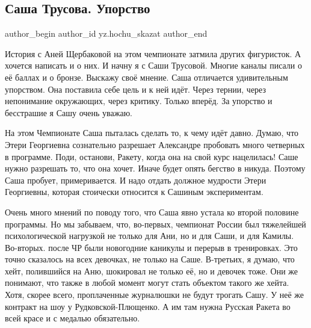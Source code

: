  
 
 
 
 
\subsection{Саша Трусова. Упорство}
\label{sec:18_01_2022.yz.hochu_skazat.1.trusova}

\ifcmt
 author_begin
   author_id yz.hochu_skazat
 author_end
\fi

История с Аней Щербаковой на этом чемпионате затмила других фигуристок. А
хочется написать и о них. И начну я с Саши Трусовой. Многие каналы писали о её
баллах и о бронзе. Выскажу своё мнение. Саша отличается удивительным упорством.
Она поставила себе цель и к ней идёт. Через тернии, через непонимание
окружающих, через критику. Только вперёд. За упорство и бесстрашие я Сашу очень
уважаю.

На этом Чемпионате Саша пыталась сделать то, к чему идёт давно. Думаю, что
Этери Георгиевна сознательно разрешает Александре пробовать много четверных в
программе. Поди, останови, Ракету, когда она на свой курс нацелилась! Саше
нужно разрешать то, что она хочет. Иначе будет опять бегство в никуда. Поэтому
Саша пробует, примеривается. И надо отдать должное мудрости Этери Георгиевны,
которая стоически относится к Сашиным экспериментам. 

Очень много мнений по поводу того, что Саша явно устала ко второй половине
программы. Но мы забываем, что, во-первых, чемпионат России был тяжелейшей
психологической нагрузкой не только для Ани, но и для Саши, и для Камилы.
Во-вторых. после ЧР были новогодние каникулы и перерыв в тренировках. Это точно
сказалось на всех девочках, не только на Саше. В-третьих, я думаю, что хейт,
полившийся на Аню, шокировал не только её, но и девочек тоже. Они же понимают,
что также в любой момент могут стать объектом такого же хейта. Хотя, скорее
всего, проплаченные журналюшки не будут трогать Сашу. У неё же контракт на шоу
у Рудковской-Плющенко. А им там нужна Русская Ракета во всей красе и с медалью
обязательно. 

